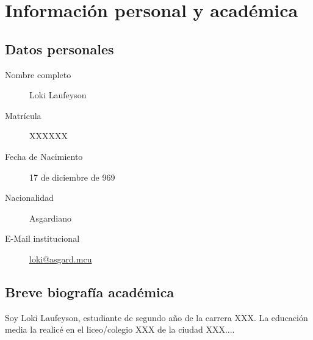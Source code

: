 \documentclass[../portafolio.tex]{subfiles}
\begin{document}
\chapter*{Información personal y académica}


\section*{Datos personales}

\begin{description}
\item[{Nombre completo}] Loki Laufeyson %
\item[{Matrícula}] XXXXXX               %
\item[{Fecha de Nacimiento}] 17 de diciembre de 969 %
\item[{Nacionalidad}] Asgardiano
\item[{E-Mail institucional}] \href{mailto:loki@asgard.mcu}{loki@asgard.mcu}
\end{description}


\section*{Breve biografía académica}

Soy Loki Laufeyson, estudiante de segundo año de la carrera XXX. La educación media la realicé en el liceo/colegio XXX de la ciudad XXX....
\end{document}
